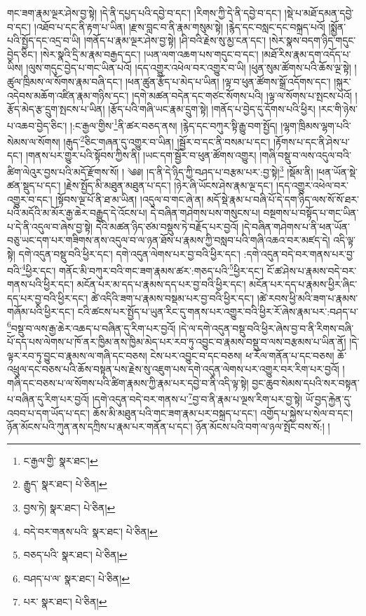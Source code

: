 གང་ཟག་རྣམ་ལྔར་ཤེས་བྱ་སྟེ། །དེ་ནི་དཔྱད་པའི་དབྱེ་བ་དང་། །རིགས་ཀྱི་དེ་ནི་དབྱེ་བ་དང་། །སྡེ་པ་མཐོ་དམན་དབྱེ་བ་དང་། །འཐོབ་པ་དང་ནི་རྟག་པ་ཡིན། །རྫས་བླང་བ་ནི་རྣམ་གསུམ་སྟེ། །རྙེད་དང་བསླང་དང་བསྐྲད་པའོ། །སྨྱོན་པའི་སྤྱོད་དང་འདྲ་བ་ཡི། །གནོད་པ་རྣམ་ལྔར་ཤེས་བྱ་སྟེ། །ཤི་བའི་རྗེས་སུ་མྱ་ངན་དང་། །སེར་སྣས་བདག་ཉིད་གདུང་བྱེད་ཅིང་། །སེར་སྣའི་དྲི་མ་རྣམ་བརྒྱད་དང་། །ཡན་ལག་འཆག་པས་གདུང་བ་དང་། །མཐོ་རིས་རྣམ་དག་འདོད་པ་ཡིས། །ལུས་གདུང་བྱེད་པ་གང་ཡིན་པའོ། །དད་འགྱུར་འཕེལ་བར་འགྱུར་བ་ཡི། །ཕུན་སུམ་ཚོགས་པའི་ཆོས་ལྔ་སྟེ། །ཚུལ་ཁྲིམས་ལ་སོགས་རྣམ་བཞི་དང་། །ཕན་ཚུན་རྩོད་པ་མེད་པ་ཡིན། །ལྟ་བ་ཕུན་ཚོགས་སྒྲོ་འདོགས་དང་། །སྐུར་འདེབས་མཆོག་འཛིན་རྣམ་གཉིས་དང་། །དགེ་མཚན་བདེན་དང་གཙང་སོགས་པའི། །ལྟ་ལ་སོགས་པ་སྤངས་པའོ། །རྩོད་མེད་རྩ་དྲུག་སྤངས་པ་ཡིན། །རྩོད་པའི་གཞི་ཡང་རྣམ་དྲུག་སྟེ། །གནོད་པ་བྱེད་དུ་དོགས་པའི་ཕྱིར། །རང་གི་ཉེས་པ་འཆབ་བྱེད་ཅིང་། །:ང་རྒྱལ་གྱིས་\footnote{ང་རྒྱལ་གྱི་  སྣར་ཐང་། }ནི་ཚར་བཅད་ནས། །རྙེད་དང་བཀུར་སྟི་རྒྱུ་བག་སྤྱོད། །ལྷག་ཁྲིམས་ལྷག་པའི་སེམས་ལ་སོགས། །རྒུད་\footnote{རྒྱུད་  སྣར་ཐང་།  པེ་ཅིན། }ཅིང་གཞན་དུ་འགྱུར་བ་ཡིན། །སྦྱོར་བ་དང་ནི་བསམ་པ་དང་། །རྟོགས་པ་དང་ནི་ཤེས་པ་དང་། །གནས་པར་གྱུར་པའི་སྟོབས་ཀྱིས་ནི། །ཡང་དག་སྦྱོར་བ་ཕུན་ཚོགས་འགྱུར། །གཞི་བསྡུ་བ་ལས་འདུལ་བའི་ཚིག་ལེའུར་བྱས་པའི་མདོ་རྫོགས་སོ། ། ༄༅། །ད་ནི་དེ་ཉིད་ཀྱི་བཤད་པ་བརྩམ་པར་:བྱ་སྟེ།\footnote{བྱས་ཏེ།  སྣར་ཐང་།  པེ་ཅིན། } །སྡོམ་ནི། །ཕན་ཡོན་སྡེ་ཚན་སྡུད་པ་དང་། །རྗེས་སྤྱོད་མི་མཐུན་མཐུན་པ་དང་། །ཉེར་ཞི་ཡོངས་ཤེས་རྣམ་ལྔ་དང་། །དད་འགྱུར་འཕེལ་བར་འགྱུར་བ་དང་། །སྟོབས་ལྔ་པོ་ནི་ཐ་མ་ཡིན། །འདུལ་བ་གང་ཞེ་ན། མདོ་སྡེ་རྣམ་པ་བཞི་པོ་དེ་དག་ཉིད་ལས་སོ་སོ་ཐར་པའི་མདོའི་མ་མོར་རྒྱ་ཆེར་བརྒྱུད་དེ་འོངས་པ། དེ་བཞིན་གཤེགས་པས་གསུངས་པ། བསྔགས་པ་བསྟོད་པ་གང་ཡིན་པ་དེ་ནི་འདུལ་བ་ཞེས་བྱ་སྟེ། དེའི་མཚན་ཉིད་ཙམ་བསྡུས་ཏེ་བརྗོད་པར་བྱའོ། །དེ་བཞིན་གཤེགས་པ་ནི་ཕན་ཡོན་བཅུ་ཡང་དག་པར་གཟིགས་ནས་འདུལ་བ་ལ་ཉན་ཐོས་པ་རྣམས་ཀྱི་བསླབ་པའི་གཞི་འཆའ་བར་མཛད་དེ། འདི་ལྟ་སྟེ། དགེ་འདུན་བསྡུ་བའི་ཕྱིར་དང་། དགེ་འདུན་ལེགས་པར་བྱ་བའི་ཕྱིར་དང་། :དགེ་འདུན་བདེ་བར་གནས་པར་བྱ་བའི་\footnote{བདེ་བར་གནས་པའི་  སྣར་ཐང་།  པེ་ཅིན། }ཕྱིར་དང་། གནོང་མི་བཀུར་བའི་གང་ཟག་རྣམས་ཚར་:གཅད་པའི་\footnote{བཅད་པའི་  སྣར་ཐང་།  པེ་ཅིན། }ཕྱིར་དང་། ངོ་ཚ་ཤེས་པ་རྣམས་བདེ་བར་གནས་པའི་ཕྱིར་དང་། མངོན་པར་མ་དད་པ་རྣམས་དད་པར་བྱ་བའི་ཕྱིར་དང་། མངོན་པར་དད་པ་རྣམས་ཕྱིར་ཞིང་དད་པར་བྱ་བའི་ཕྱིར་དང་། ཚེ་འདིའི་ཟག་པ་རྣམས་བསྡམ་པར་བྱ་བའི་ཕྱིར་དང་། །ཚེ་རབས་ཕྱི་མའི་ཟག་པ་རྣམས་གཞོམ་པའི་ཕྱིར་དང་། ངའི་ཚངས་པར་སྤྱོད་པ་ཡུན་རིང་དུ་གནས་པར་འགྱུར་བའི་ཕྱིར་རོ་ཞེས་རྣམ་པར་:བཤད་པ་\footnote{བཤད་པ་ལ་  སྣར་ཐང་།  པེ་ཅིན། }བསྡུ་བ་ལས་རྒྱ་ཆེར་འཆད་པ་བཞིན་དུ་རིག་པར་བྱའོ། །དེ་ལ་དགེ་འདུན་བསྡུ་བའི་ཕྱིར་ཞེས་བྱ་བ་ནི་རིགས་བཞི་པོ་དད་པས་ལེགས་པ་ཁོ་ནར་ཁྱིམ་ནས་ཁྱིམ་མེད་པར་རབ་ཏུ་འབྱུང་བ་རྣམས་བསྡུ་བ་ལས་བརྩམས་པ་ཡིན་ནོ། །དེ་ལྟར་རབ་ཏུ་བྱུང་བ་རྣམས་ལ་གཞི་དང་བཅས། ངེས་པར་འབྱུང་བ་དང་བཅས། ཕ་རོལ་གནོན་པ་དང་བཅས། ཆོ་འཕྲུལ་དང་བཅས་པའི་ཆོས་བསྟན་པས་རྗེས་སུ་འཇུག་པས་དགེ་འདུན་ལེགས་པར་འགྱུར་བར་རིག་པར་བྱའོ། །གཞི་དང་བཅས་པ་ལ་སོགས་པའི་ཚིག་རྣམས་ཀྱི་རྣམ་པར་དབྱེ་བ་ནི་འདི་ལྟ་སྟེ། བྱང་ཆུབ་སེམས་དཔའི་སར་བསྟན་པ་བཞིན་དུ་རིག་པར་བྱའོ། །དགེ་འདུན་བདེ་བར་གནས་པ་\footnote{པར་  སྣར་ཐང་།  པེ་ཅིན། }བྱ་བ་ནི་རྣམ་པ་ལྔས་རིག་པར་བྱ་སྟེ། ཡོ་བྱད་རྐྱེན་དུ་འབབ་པ་དག་ཡོད་པ་དང་། ཆོས་མི་མཐུན་པའི་གང་ཟག་རྣམ་པར་བསྐྲད་པ་དང་། འགྱོད་པ་སྐྱེས་པ་སེལ་བ་དང་། ཉོན་མོངས་པའི་ཀུན་ནས་དཀྲིས་པ་རྣམ་པར་གནོན་པ་དང་། ཉོན་མོངས་པའི་བག་ལ་ཉལ་སྤོང་བས་སོ:། །
